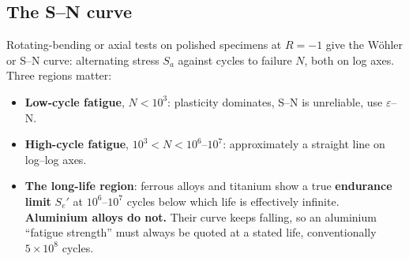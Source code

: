 \documentclass[11pt,a4paper]{article}
\begin{document}
\subsection{The S--N curve}
Rotating-bending or axial tests on polished specimens at $R=-1$ give the W\"ohler or S--N curve: alternating stress $S_a$ against cycles to failure $N$, both on log axes. Three regions matter:
\begin{itemize}[nosep]
  \item \textbf{Low-cycle fatigue}, $N<10^{3}$: plasticity dominates, S--N is unreliable, use $\varepsilon$--N.
  \item \textbf{High-cycle fatigue}, $10^{3}<N<10^{6}$--$10^{7}$: approximately a straight line on log--log axes.
  \item \textbf{The long-life region}: ferrous alloys and titanium show a true \textbf{endurance limit} $S_e'$ at $10^{6}$--$10^{7}$ cycles below which life is effectively infinite. \textbf{Aluminium alloys do not.} Their curve keeps falling, so an aluminium ``fatigue strength'' must always be quoted at a stated life, conventionally $5\times10^{8}$ cycles.
\end{itemize}
\end{document}
